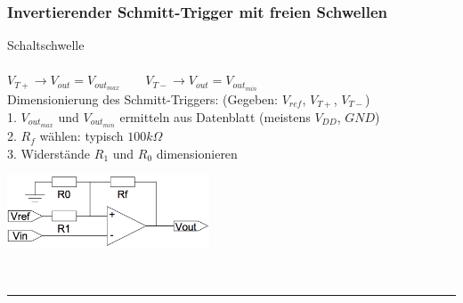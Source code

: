   \subsubsection{Invertierender Schmitt-Trigger mit freien Schwellen}
    \begin{minipage}[T]{13cm}
      Schaltschwelle
      \hspace{20.8mm}\\ \\
      $V_{T+} \rightarrow V_{out} = V_{out_{max}} \qquad V_{T-} \rightarrow V_{out} = V_{out_{min}}$ \\
      Dimensionierung des Schmitt-Triggers: (Gegeben: $V_{ref}$, $V_{T+}$, $V_{T-}$)\\
      1. $V_{out_{max}}$ und $V_{out_{min}}$ ermitteln aus Datenblatt (meistens $V_{DD}$, $GND$)\\
      2. $R_f$ w\"ahlen: typisch $100 k\Omega$\\
      3. Widerst\"ande $R_1$ und $R_0$ dimensionieren\\
    \end{minipage} 
    \begin{minipage}{6cm}
      \includegraphics[width=6cm]{./bilder/i-schmittFreieSchwellen.png} 
    \end{minipage}\\
\hrule

